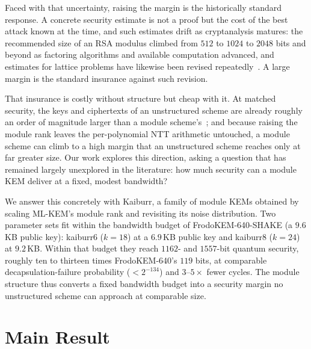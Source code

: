 \documentclass[journal=tosc,submission]{iacrtrans}
\begin{document}
Faced with that uncertainty, raising the margin is the historically standard response.
A concrete security estimate is not a proof but the cost of the best attack known at the time, and such estimates drift as cryptanalysis matures: the recommended size of an RSA modulus climbed from $512$ to $1024$ to $2048$ bits and beyond as factoring algorithms and available computation advanced, and estimates for lattice problems have likewise been revised repeatedly~\cite{TODO-lattice-estimates}.
A large margin is the standard insurance against such revision.

That insurance is costly without structure but cheap with it.
At matched security, the keys and ciphertexts of an unstructured scheme are already roughly an order of magnitude larger than a module scheme's~\cite{TODO-frodo-ring}; and because raising the module rank leaves the per-polynomial NTT arithmetic untouched, a module scheme can climb to a high margin that an unstructured scheme reaches only at far greater size.
Our work explores this direction, asking a question that has remained largely unexplored in the literature: how much security can a module KEM deliver at a fixed, modest bandwidth?

We answer this concretely with \textsf{Kaiburr}, a family of module KEMs obtained by scaling ML-KEM's module rank and revisiting its noise distribution.
Two parameter sets fit within the bandwidth budget of FrodoKEM-640-SHAKE (a $9.6$\,KB public key): \textsf{kaiburr6} ($k=18$) at a $6.9$\,KB public key and \textsf{kaiburr8} ($k=24$) at $9.2$\,KB.
Within that budget they reach $1162$- and $1557$-bit quantum security, roughly ten to thirteen times FrodoKEM-640's $119$ bits, at comparable decapsulation-failure probability ($<2^{-134}$) and $3$--$5\times$ fewer cycles.
The module structure thus converts a fixed bandwidth budget into a security margin no unstructured scheme can approach at comparable size.

\section{Main Result}
\label{sec:main}



\end{document}
